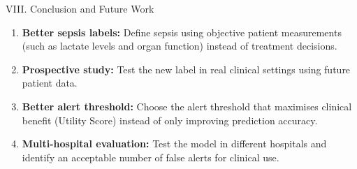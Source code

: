 \begin{frame}{VIII. Conclusion and Future Work}
\begin{enumerate}
  \item \textbf{Better sepsis labels:} Define sepsis using objective patient
        measurements (such as lactate levels and organ function) instead of
        treatment decisions.
  \item \textbf{Prospective study:} Test the new label in real clinical
        settings using future patient data.
  \item \textbf{Better alert threshold:} Choose the alert threshold that
        maximises clinical benefit (Utility Score) instead of only improving
        prediction accuracy.
  \item \textbf{Multi-hospital evaluation:} Test the model in different
        hospitals and identify an acceptable number of false alerts for
        clinical use.
\end{enumerate}
\end{frame}
